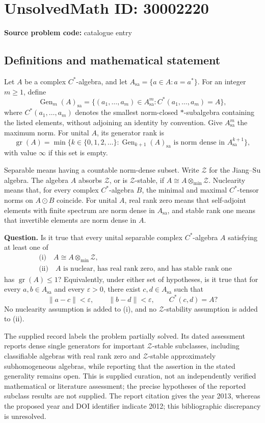 \documentclass[11pt]{article}
\begin{document}
\section*{UnsolvedMath ID: 30002220}
\textbf{Source problem code:} catalogue entry
\subsection{Definitions and mathematical statement}
Let \(A\) be a complex \(C^*\)-algebra, and let \(A_{\mathrm{sa}}=\{a\in A:a=a^*\}\). For an integer \(m\geq 1\), define
\[
\operatorname{Gen}_m(A)_{\mathrm{sa}}=\{(a_1,\ldots,a_m)\in A_{\mathrm{sa}}^m:C^*(a_1,\ldots,a_m)=A\},
\]
where \(C^*(a_1,\ldots,a_m)\) denotes the smallest norm-closed \(*\)-subalgebra containing the listed elements, without adjoining an identity by convention. Give \(A_{\mathrm{sa}}^m\) the maximum norm. For unital \(A\), its generator rank is
\[
\operatorname{gr}(A)=\min\{k\in\{0,1,2,\ldots\}:\operatorname{Gen}_{k+1}(A)_{\mathrm{sa}}\text{ is norm dense in }A_{\mathrm{sa}}^{k+1}\},
\]
with value \(\infty\) if this set is empty.

Separable means having a countable norm-dense subset. Write \(\mathcal Z\) for the Jiang--Su algebra. The algebra \(A\) absorbs \(\mathcal Z\), or is \(\mathcal Z\)-stable, if \(A\cong A\otimes_{\min}\mathcal Z\). Nuclearity means that, for every complex \(C^*\)-algebra \(B\), the minimal and maximal \(C^*\)-tensor norms on \(A\odot B\) coincide. For unital \(A\), real rank zero means that self-adjoint elements with finite spectrum are norm dense in \(A_{\mathrm{sa}}\), and stable rank one means that invertible elements are norm dense in \(A\).

\textbf{Question.} Is it true that every unital separable complex \(C^*\)-algebra \(A\) satisfying at least one of
\[
\begin{aligned}
&\text{(i)}\quad A\cong A\otimes_{\min}\mathcal Z,\\
&\text{(ii)}\quad A\text{ is nuclear, has real rank zero, and has stable rank one}
\end{aligned}
\]
has \(\operatorname{gr}(A)\leq 1\)? Equivalently, under either set of hypotheses, is it true that for every \(a,b\in A_{\mathrm{sa}}\) and every \(\varepsilon>0\), there exist \(c,d\in A_{\mathrm{sa}}\) such that
\[
\|a-c\|<\varepsilon,\qquad \|b-d\|<\varepsilon,\qquad C^*(c,d)=A?
\]
No nuclearity assumption is added to (i), and no \(\mathcal Z\)-stability assumption is added to (ii).

The supplied record labels the problem partially solved. Its dated assessment reports dense single generators for important \(\mathcal Z\)-stable subclasses, including classifiable algebras with real rank zero and \(\mathcal Z\)-stable approximately subhomogeneous algebras, while reporting that the assertion in the stated generality remains open. This is supplied curation, not an independently verified mathematical or literature assessment; the precise hypotheses of the reported subclass results are not supplied. The report citation gives the year 2013, whereas the proposed year and DOI identifier indicate 2012; this bibliographic discrepancy is unresolved.
\end{document}
